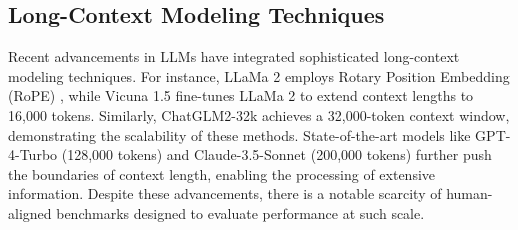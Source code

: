 
\subsection{Long-Context Modeling Techniques}
Recent advancements in LLMs have integrated sophisticated long-context modeling techniques. For instance, LLaMa 2 employs Rotary Position Embedding (RoPE) \cite{Touvron2023}, while Vicuna 1.5 \cite{Zheng2023} fine-tunes LLaMa 2 to extend context lengths to 16,000 tokens. Similarly, ChatGLM2-32k achieves a 32,000-token context window, demonstrating the scalability of these methods. State-of-the-art models like GPT-4-Turbo (128,000 tokens) and Claude-3.5-Sonnet (200,000 tokens) further push the boundaries of context length, enabling the processing of extensive information. Despite these advancements, there is a notable scarcity of human-aligned benchmarks designed to evaluate performance at such scale.